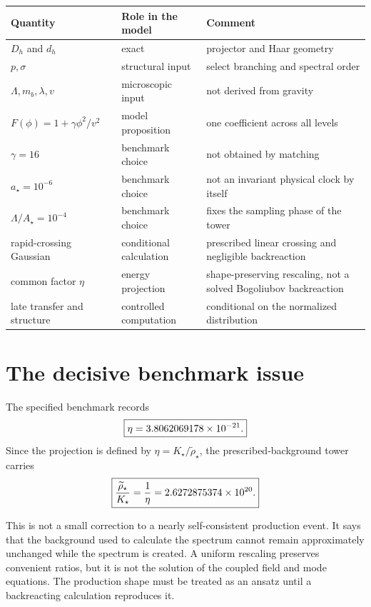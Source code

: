 \begin{longtable}{@{}P{0.32\textwidth}P{0.23\textwidth}P{0.35\textwidth}@{}}
\toprule
Quantity & Role in the model & Comment\\
\midrule
$D_h$ and $d_h$ & exact & projector and Haar geometry\\
$p,\sigma$ & structural input & select branching and spectral order\\
$\Lambda,m_b,\lambda,v$ & microscopic input & not derived from gravity\\
$F(\phi)=1+\gamma\phi^2/v^2$ & model proposition & one coefficient across all levels\\
$\gamma=16$ & benchmark choice & not obtained by matching\\
$a_\star=10^{-6}$ & benchmark choice & not an invariant physical clock by itself\\
$\Lambda/A_\star=10^{-4}$ & benchmark choice & fixes the sampling phase of the tower\\
rapid-crossing Gaussian & conditional calculation & prescribed linear crossing and negligible backreaction\\
common factor $\eta$ & energy projection & shape-preserving rescaling, not a solved Bogoliubov backreaction\\
late transfer and structure & controlled computation & conditional on the normalized distribution\\
\bottomrule
\end{longtable}

\section{The decisive benchmark issue}

The specified benchmark records
\begin{equation}
\boxed{\eta=3.8062069178\times 10^{-21}.}
\label{eq:audit-eta}
\end{equation}
Since the projection is defined by $\eta=K_\star/\widetilde\rho_\star$, the prescribed-background tower carries
\begin{equation}
\boxed{
\frac{\widetilde\rho_\star}{K_\star}
=\frac1\eta
=2.6272875374\times 10^{20}.}
\label{eq:audit-overdraw}
\end{equation}

\begin{negativebox}[Interpretation]
This is not a small correction to a nearly self-consistent production event.  It says that the background used to calculate the spectrum cannot remain approximately unchanged while the spectrum is created.  A uniform rescaling preserves convenient ratios, but it is not the solution of the coupled field and mode equations.  The production shape must be treated as an ansatz until a backreacting calculation reproduces it.
\end{negativebox}

